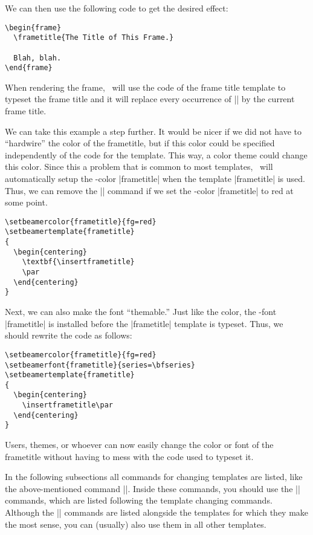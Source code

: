 We can then use the following code to get the desired effect:
\begin{verbatim}
\begin{frame}
  \frametitle{The Title of This Frame.}

  Blah, blah.
\end{frame}
\end{verbatim}
When rendering the frame, \beamer\ will use the code of the
frame title template to typeset the frame title and it will replace
every occurrence of |\insertframetitle| by the current frame
title.

We can take this example a step further. It would be nicer if we did
not have to ``hardwire'' the color of the frametitle, but if this
color could be specified independently of the code for the
template. This way, a color theme could change this color. Since this
a problem that is common to most templates, \beamer\ will
automatically setup the \beamer-color |frametitle| when the template
|frametitle| is used. Thus, we can remove the |\color{red}| command if
we set the \beamer-color |frametitle| to red at some point.
\begin{verbatim}
\setbeamercolor{frametitle}{fg=red}
\setbeamertemplate{frametitle}
{
  \begin{centering}
    \textbf{\insertframetitle}
    \par
  \end{centering}
}
\end{verbatim}
Next, we can also make the font ``themable.'' Just like the color, the
\beamer-font |frametitle| is installed before the |frametitle|
template is typeset. Thus, we should rewrite the code as follows:
\begin{verbatim}
\setbeamercolor{frametitle}{fg=red}
\setbeamerfont{frametitle}{series=\bfseries}
\setbeamertemplate{frametitle}
{
  \begin{centering}
    \insertframetitle\par
  \end{centering}
}
\end{verbatim}
Users, themes, or whoever can now easily change the color or font of
the frametitle without having to mess with the code used to typeset
it.







In the following subsections all commands for changing templates are
listed, like the above-mentioned command
|\useframetitletemplate|. Inside these commands, you should use
the |\insertxxxx| commands, which are listed following the template
changing commands. Although the |\insertxxxx| commands are listed
alongside the templates for which they make the most sense, you can
(usually) also use them in all other templates.

